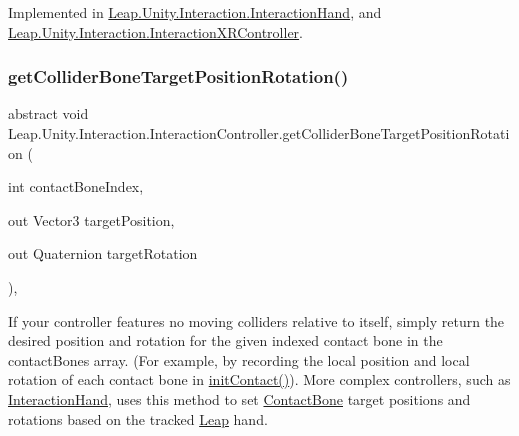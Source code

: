 Implemented in \mbox{\hyperlink{class_leap_1_1_unity_1_1_interaction_1_1_interaction_hand_a899637eb040f88fa2cac4b27e4113684}{Leap.\+Unity.\+Interaction.\+Interaction\+Hand}}, and \mbox{\hyperlink{class_leap_1_1_unity_1_1_interaction_1_1_interaction_x_r_controller_abbf181ce05807d75809cac14c0fa8a27}{Leap.\+Unity.\+Interaction.\+Interaction\+X\+R\+Controller}}.

\mbox{\label{class_leap_1_1_unity_1_1_interaction_1_1_interaction_controller_ae5ccd0183ff87fd51107a5b082116ce0}} 
\subsubsection{\texorpdfstring{getColliderBoneTargetPositionRotation()}{getColliderBoneTargetPositionRotation()}}
{\footnotesize\ttfamily abstract void Leap.\+Unity.\+Interaction.\+Interaction\+Controller.\+get\+Collider\+Bone\+Target\+Position\+Rotation (\begin{DoxyParamCaption}\item[{int}]{contact\+Bone\+Index,  }\item[{out Vector3}]{target\+Position,  }\item[{out Quaternion}]{target\+Rotation }\end{DoxyParamCaption})\hspace{0.3cm}{\ttfamily [protected]}, {}}



If your controller features no moving colliders relative to itself, simply return the desired position and rotation for the given indexed contact bone in the contact\+Bones array. (For example, by recording the local position and local rotation of each contact bone in \mbox{\hyperlink{class_leap_1_1_unity_1_1_interaction_1_1_interaction_controller_a5d9713dd48f3093aefbd8ebbba3b0251}{init\+Contact()}}). More complex controllers, such as \mbox{\hyperlink{class_leap_1_1_unity_1_1_interaction_1_1_interaction_hand}{Interaction\+Hand}}, uses this method to set \mbox{\hyperlink{class_leap_1_1_unity_1_1_interaction_1_1_contact_bone}{Contact\+Bone}} target positions and rotations based on the tracked \mbox{\hyperlink{namespace_leap_1_1_unity_1_1_leap}{Leap}} hand. 




